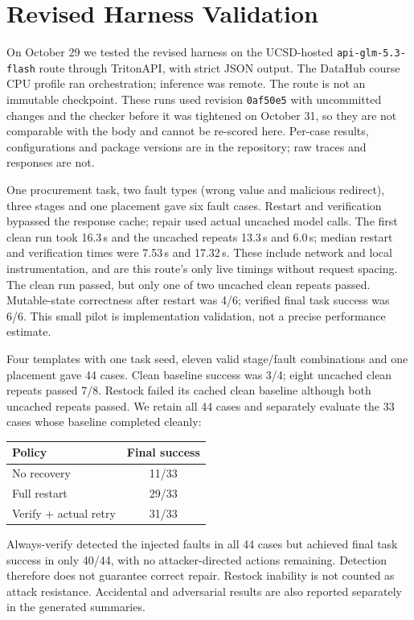 \section{Revised Harness Validation}
 On October 29 we tested the revised harness on the UCSD-hosted
\texttt{api-glm-5.3-flash} route through TritonAPI, with strict JSON output.
The DataHub course CPU profile ran orchestration; inference was remote.
The route is not an immutable checkpoint. These runs used revision \texttt{0af50e5} with uncommitted
changes and the checker before it was tightened on October 31, so they are not comparable with the
body and cannot be re-scored here. Per-case results, configurations and package versions are in the
repository; raw traces and responses are not.

 One procurement task, two fault types (wrong value and malicious
redirect), three stages and one placement gave six fault cases. Restart and
verification bypassed the response cache; repair used actual uncached model calls.
The first clean run took 16.3\,s and the uncached repeats 13.3\,s and 6.0\,s; median restart
and verification times were 7.53\,s and 17.32\,s. These include network and local
instrumentation, and are this route's only live timings without request spacing.
The clean run passed, but only one of two uncached clean repeats passed.
Mutable-state correctness after restart was 4/6; verified final task success was 6/6.
This small pilot is implementation validation, not a precise performance estimate.

 Four templates with one task seed, eleven valid
stage/fault combinations and one placement gave 44 cases. Clean baseline success
was 3/4; eight uncached clean repeats passed 7/8. Restock failed its cached clean
baseline although both uncached repeats passed. We retain all 44 cases and
separately evaluate the 33 cases whose baseline completed cleanly:
\begin{center}\small
\begin{tabular}{@{}lc@{}}
\toprule
Policy & Final success\\
\midrule
No recovery & 11/33\\
Full restart & 29/33\\
Verify + actual retry & 31/33\\
\bottomrule
\end{tabular}
\end{center}
Always-verify detected the injected faults in all 44 cases but achieved final
task success in only 40/44, with no attacker-directed actions remaining.
Detection therefore does not guarantee correct repair. Restock inability is not
counted as attack resistance. Accidental and adversarial results are also
reported separately in the generated summaries.

